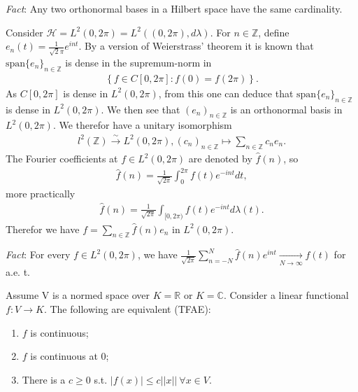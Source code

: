 \emph{Fact}: Any two orthonormal bases in a Hilbert space have the same cardinality.
\begin{example}
    Consider \(\mathcal{H} = L^2(0,2\pi) = L^2((0,2\pi), d\lambda)\). For \(n\in\mathbb{Z}\), define
    \(e_n(t) = \frac{1}{\sqrt{2}\pi}e^{int}\). By a version of Weierstrass' theorem it is known that 
    \(\text{span}\{e_n\}_{n\in\mathbb{Z}}\) is dense in the supremum-norm in 
    \begin{align*}
        \left\{f\in C[0,2\pi]: f(0)=f(2\pi)\right\}.
    \end{align*}
    As \(C[0,2\pi]\) is dense in \(L^2(0,2\pi)\), from this one can deduce that \(\text{span}\{e_n\}_{n\in\mathbb{Z}}\) is dense
    in \(L^2(0,2\pi)\). We then see that \((e_n)_{n\in\mathbb{Z}}\) is an orthonormal basis in \(L^2(0,2\pi)\). We therefor
    have a unitary isomorphism
    \begin{align*}
        l^2(\mathbb{Z}) \xrightarrow[ ]{\sim}L^2(0,2\pi), (c_n)_{n\in\mathbb{Z}} \mapsto \sum\limits_{n\in\mathbb{Z}}c_n e_n.
    \end{align*}
    The Fourier coefficients at \(f\in L^2(0,2\pi)\) are denoted by \(\hat{f}(n)\), so 
    \begin{align*}
        \hat{f}(n) = \frac{1}{\sqrt{2\pi}}\int_{0}^{2\pi} f(t) e^{-int}dt,
    \end{align*}
    more practically
    \begin{align*}
        \hat{f}(n) = \frac{1}{\sqrt{2\pi}}\int_{[0,2\pi)} f(t) e^{-int}d\lambda(t).
    \end{align*}
    Therefor we have \(f=\sum_{n\in\mathbb{Z}} \hat{f}(n)e_n\) in \(L^2(0,2\pi)\).

    \emph{Fact}: For every \(f\in L^2(0,2\pi)\), we have \(\frac{1}{\sqrt{2\pi}} \sum_{n=-N}^{N} \hat{f}(n)e^{int}
    \xrightarrow[N\rightarrow\infty]{ } f(t)\) for a.e. t.
\end{example}

\begin{lemma}
    Assume V is a normed space over \(K=\mathbb{R}\) or \(K=\mathbb{C}\). Consider a linear functional \(f:V\rightarrow K\). The following
    are equivalent (TFAE):
    \begin{enumerate}[label=(\roman*)]
        \item \(f\) is continuous;
        \item \(f\) is continuous at 0;
        \item There is a \(c\geq0\) s.t. \(|f(x)|\leq c ||x|| \ \forall x\in V\).
    \end{enumerate}
\end{lemma}

